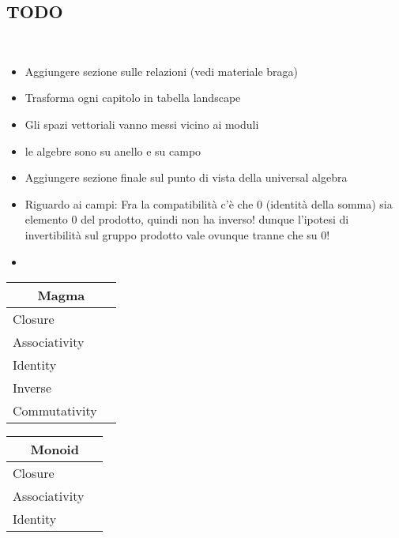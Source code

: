 \documentclass[a4paper,12pt]{scrartcl}    %
\begin{document}
\begin{landscape}
\newpage
	\begin{minipage}[c][\textheight]{0.30 \linewidth}
	    \section*{TODO}
	    \mbox{}\\
		\begin{itemize}
			\item Aggiungere sezione sulle relazioni (vedi materiale braga)
			\item Trasforma ogni capitolo in tabella landscape
			\item Gli spazi vettoriali vanno messi vicino ai moduli
			\item le algebre sono su anello e su campo
			\item Aggiungere sezione finale sul punto di vista della universal algebra
			\item Riguardo ai campi: Fra la compatibilità c'è che 0 (identità della somma) sia elemento 0 del prodotto, quindi non ha inverso! dunque l'ipotesi di invertibilità sul gruppo prodotto vale ovunque tranne che su 0!
			\item 
		\end{itemize}	
	\end{minipage}
	\hspace{1cm}
	\begin{minipage}[t][]{0.60 \linewidth}
		\begin{minipage}[c]{0,5\textwidth}	
			\begin{tabular}{|l|p{2cm}|} %
			  \hline
			  \multicolumn{2}{c}{\cellcolor{yellow!25}Magma} \\
			  \hline
			   \cellcolor{blue!25} Closure&  \\
			    \cellcolor{red!25} Associativity&  \\
			    \cellcolor{red!25} Identity&  \\
			    \cellcolor{red!25} Inverse&  \\
			    \cellcolor{red!25} Commutativity&  \\
			  \hline
			\end{tabular}
			\vfill
			\begin{tabular}{|l|p{2cm}|} %
			  \hline
			  \multicolumn{2}{c}{\cellcolor{yellow!25}Monoid} \\
			  \hline
			   \cellcolor{blue!25} Closure&  \\
			    \cellcolor{blue!25} Associativity&  \\
			    \cellcolor{blue!25} Identity&  \\

\end{tabular}
\end{minipage}
\end{minipage}
\end{landscape}
\end{document}
